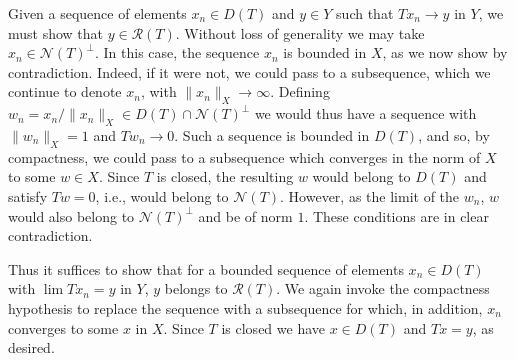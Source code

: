 \begin{Proof}
{Given a sequence of elements $x_n\in D(T)$ and $y\in Y$ such that $Tx_n\to y$ in $Y$, we must show that $y\in\mathcal R(T)$. Without loss of generality we may take $x_n\in\mathcal N(T)^\perp$. In this case, the sequence $x_n$ is bounded in $X$, as we now show by contradiction. Indeed, if it were not, we could pass to a subsequence, which we continue to denote $x_n$, with $\|x_n\|_X\to\infty$. Defining $w_n=x_n/\|x_n\|_X\in D(T)\cap\mathcal N(T)^\perp$ we would thus have a sequence with $\|w_n\|_X=1$ and $Tw_n\to0$. Such a sequence is bounded in $D(T)$, and so, by compactness, we could pass to a subsequence which converges in the norm of $X$ to some $w\in X$. Since $T$ is closed, the resulting $w$ would belong to $D(T)$ and satisfy $Tw=0$, i.e., would belong to $\mathcal N(T)$. However, as the limit of the $w_n$, $w$ would also belong to $\mathcal N(T)^\perp$ and be of norm $1$. These conditions are in clear contradiction.}

{Thus it suffices to show that for a bounded sequence of elements $x_n\in D(T)$ with $\lim Tx_n=y$ in $Y$, $y$ belongs to $\mathcal R(T)$. We again invoke the compactness hypothesis to replace the sequence with a subsequence for which, in addition, $x_n$ converges to some $x$ in $X$. Since $T$ is closed we have $x\in D(T)$ and $Tx=y$, as desired.}
\end{Proof}
